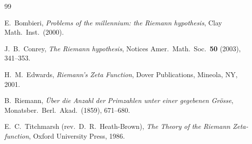 \documentclass[11pt,a4paper]{amsart}
\numberwithin{equation}{section}
\theoremstyle{plain}
\theoremstyle{definition}
\begin{document}
\begin{thebibliography}{99}

E.~Bombieri,
\emph{Problems of the millennium: the Riemann hypothesis},
Clay Math.\ Inst.\ (2000).

J.~B.\ Conrey,
\emph{The Riemann hypothesis},
Notices Amer.\ Math.\ Soc.\ \textbf{50} (2003), 341--353.

H.~M.\ Edwards,
\emph{Riemann's Zeta Function},
Dover Publications, Mineola, NY, 2001.

B.~Riemann,
\emph{\"Uber die Anzahl der Primzahlen unter einer gegebenen Gr\"osse},
Monatsber.\ Berl.\ Akad.\ (1859), 671--680.

E.~C.\ Titchmarsh (rev.\ D.~R.\ Heath-Brown),
\emph{The Theory of the Riemann Zeta-function},
Oxford University Press, 1986.

\end{thebibliography}
\end{document}
